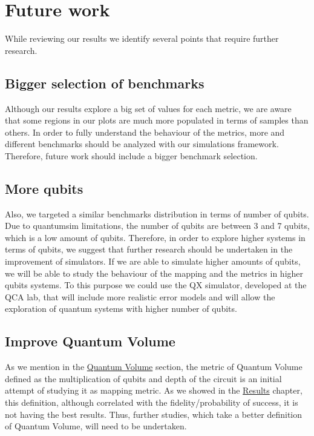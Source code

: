 \section{Future work}
\label{sec:org84160a2}

While reviewing our results we identify several points that require further research.

\subsection*{Bigger selection of benchmarks}
\label{sec:org3deb249}

Although our results explore a big set of values for each metric, we are aware that some regions in our plots are much more populated in terms of samples than others.
In order to fully understand the behaviour of the metrics, more and different benchmarks should be analyzed with our simulations framework.
Therefore, future work should include a bigger benchmark selection.

\subsection*{More qubits}
\label{sec:orga80887a}

Also, we targeted a similar benchmarks distribution in terms of number of qubits.
Due to quantumsim limitations, the number of qubits are between 3 and 7 qubits, which is a low amount of qubits.
Therefore, in order to explore higher systems in terms of qubits, we suggest that further research should be undertaken in the improvement of simulators.
If we are able to simulate higher amounts of qubits, we will be able to study the behaviour of the mapping and the metrics in higher qubits systems.
To this purpose we could use the QX simulator, developed at the QCA lab, that will include more realistic error models and will allow the exploration of quantum systems with higher number of qubits.

\subsection*{Improve Quantum Volume}
\label{sec:org8775948}

As we mention in the \hyperref[]{Quantum Volume} section, the metric of Quantum Volume defined as the multiplication of qubits and depth of the circuit is an initial attempt of studying it as mapping metric.
As we showed in the \hyperref[]{Results} chapter, this definition, although correlated with the fidelity/probability of success, it is not having the best results.
Thus, further studies, which take a better definition of Quantum Volume, will need to be undertaken.


